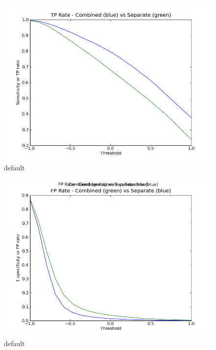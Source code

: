 \documentclass{article}
\begin{document}
\begin{figure}[htbp]
\begin{center}
\includegraphics[width=1\textwidth]{TP_Rate.png}
\caption{default}
\label{default}
\end{center}
\end{figure}

\begin{figure}[htbp]
\begin{center}
\includegraphics[width=1\textwidth]{FP_Rate.png}
\caption{default}
\label{default}
\end{center}
\end{figure}

\end{document}

